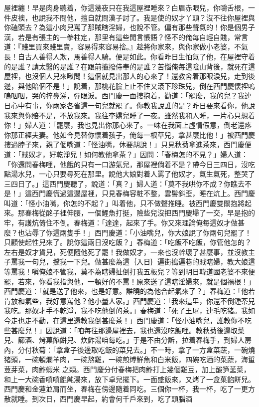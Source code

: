 \begin{showcontents}{}
屋裡纏！早是肉身聽着，你這幾夜只在我這屋裡睡來？白眉赤眼兒，你嚼舌根，一件皮襖，也說我不問他，擅自就問漢子討了。我是使的奴才丫頭？沒不往你屋裡與你磕頭去？為這小肉兒罵了那賊瞎淫婦，也說不管。偏有那些聲氣的！你是個男子漢，若是有張主的一拳柱定，那里有這些閒言悵語？怪不的俺每自輕自賤，常言道：『賤里買來賤里賣，容易得來容易捨。』趁將你家來，與你家做小老婆，不氣長！自古人善得人欺，馬善得人騎。便是如此。你看昨日生怕氣了他，在屋裡守着的是誰？請太醫的是誰？在跟前攛撥侍奉的是誰？苦惱俺每這陰山背後，就死在這屋裡，也沒個人兒來啾問！這個就見出那人的心來了！還教舍着那眼淚兒，走到後邊，與他賠個不是！」說着，那桃花臉上止不住又滾下珍珠兒，倒在西門慶懷裡嗚嗚咽咽，哭的捽鼻涕，彈眼淚。西門慶一面摟抱着，勸道：「罷麼，我的兒？我連日心中有事，你兩家各省這一句兒就罷了。你教我說誰的是？昨日要來看你，他說我來與你賠不是，不放我來。我往李嬌兒睡了一夜。雖然我和人睡，一片心只想着你！」婦人道：「罷麼，我也見出你那心來了。一味在我面上虛情假意，倒老還疼你那正經夫妻。他如今見替你懷着孩子，俺每一根草兒，拿甚麼比他！」被西門慶摟過脖子來，親了個嘴道：「怪油嘴，休要胡說！」只見秋菊拿進茶來，西門慶便道：「賊奴才，好乾淨兒！如何教他拿茶？」因問：「春梅怎的不見？」婦人道：「你還問春梅哩，他餓的只有一口游氣兒，那屋裡倘着不是？帶今日三四日，沒吃點湯水兒，一心只要尋死在那里。說他大娘對着人罵了他奴才，氣生氣死，整哭了三四日了。」這西門慶聽了，說道：「真？」婦人道：「莫不我哄你不成？你瞧去不是！」這西門慶慌過這邊屋裡，只見春梅容粧不整，雲髻斜歪，睡在炕上。西門慶叫道：「怪小油嘴，你怎的不起？」叫着他，只不做聲推睡。被西門慶雙關抱將起來。那春梅從酩子裡伸腰，一個鯉魚打挺，險些兒沒把西門慶埽了一交，早是抱的牢，有護炕倚住不倒。春梅道：「達達，起來了手。你又來理論俺每這奴才做甚麼？也沾辱了你這兩隻手！」西門慶道：「小油嘴兒，你大娘說了你兩句兒罷了！只顧使起性兒來了。說你這兩日沒吃飯？」春梅道：「吃飯不吃飯，你管他怎的？左右是奴才貨兒，死便隨他死了罷！我做奴才，一來也沒幹壞了甚麼事，並沒教主子罵我一句兒，攩我一下兒。做甚麼為這｛入日｝遍街搗遍巷的賊瞎婦，教大娘這等罵我！嗔俺娘不管我，莫不為瞎婦扯倒打我五板兒？等到明日韓道國老婆不來便罷，若來，你看我指與他，一頓好的不罵！原來送了這瞎淫婦來，就是個禍根！」西門慶道：「就是送了他來，也是好意。誰曉的為他合起氣來了？」春梅道：「他若肯放和氣些，我好意罵他？他小量人家。」西門慶道：「我來這里，你還不倒鍾茶兒我吃。那奴才手不乾淨，我不吃他倒的茶。」春梅道：「死了王屠，連毛吃猪。我如今走也走不動，在這里還教我倒甚麼茶！」西門慶道：「怪小油嘴兒，誰教你不吃些甚麼兒！」因說道：「咱每往那邊屋裡去，我也還沒吃飯哩。教秋菊後邊取菜兒、篩酒、烤菓餡餅兒、炊鮓湯咱每吃。」于是不由分訴，拉着春梅手，到婦人房內，分付秋菊：「拿盒子後邊取吃飯的菜兒去。」不一時，拿了一方盒菜蔬，一碗燒猪頭，一碗頓爛羊肉，一碗熬雞，一碗煎煿鮮魚和白米飯，四碗吃酒的菜蔬，海蜇荳芽菜，肉鮓蝦米 之類。西門慶分付春梅把肉鮓打上幾個雞豆，加上酸笋韮菜，和上一大碗香噴噴餛飩湯來，放下卓兒擺下。一面盛飯來，又烤了一盒菓餡餅兒。西門慶和金蓮並肩而坐，春梅在傍邊隨着同吃。三個你一杯，我一杯，吃了一更方散就睡。到次日，西門慶早起，約會何千戶來到，吃了頭腦酒 
\end{showcontents}
